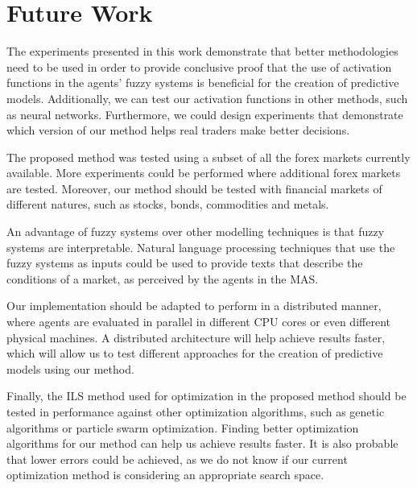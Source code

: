 ﻿\documentclass{ieeeaccess}
\begin{document}



\section{Future Work}
\label{section:future-work}

The experiments presented in this work demonstrate that better
methodologies need to be used in order to provide conclusive proof
that the use of activation functions in the agents' fuzzy systems is
beneficial for the creation of predictive models. Additionally, we can
test our activation functions in other methods, such as neural
networks. Furthermore, we could design experiments that demonstrate
which version of our method helps real traders make better decisions.

The proposed method was tested using a subset of all the forex markets
currently available. More experiments could be performed where
additional forex markets are tested. Moreover, our method should be
tested with financial markets of different natures, such as stocks,
bonds, commodities and metals.

An advantage of fuzzy systems over other modelling techniques is that
fuzzy systems are interpretable. Natural language processing
techniques that use the fuzzy systems as inputs could be used to
provide texts that describe the conditions of a market, as perceived
by the agents in the MAS.

Our implementation should be adapted to perform in a distributed
manner, where agents are evaluated in parallel in different CPU cores
or even different physical machines. A distributed architecture will
help achieve results faster, which will allow us to test different
approaches for the creation of predictive models using our method.

Finally, the ILS method used for optimization in the proposed method should be
tested in performance against other optimization algorithms, such as genetic
algorithms or particle swarm optimization. Finding better optimization
algorithms for our method can help us achieve results faster. It is
also probable that lower errors could be achieved, as we do not know
if our current optimization method is considering an appropriate
search space.
\end{document}
